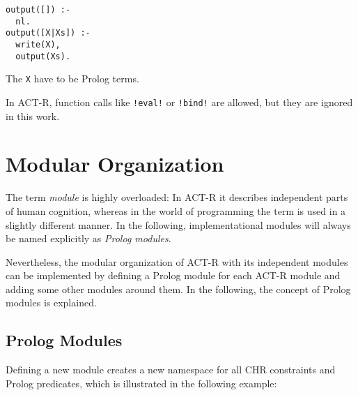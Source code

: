 \begin{lstlisting}
output([]) :-
  nl.
output([X|Xs]) :-
  write(X),
  output(Xs).
\end{lstlisting}

The \verb|X| have to be Prolog terms.

In ACT-R, function calls like \verb|!eval!| or \verb|!bind!| are allowed, but they are ignored in this work.

\section{Modular Organization}

The term \emph{module} is highly overloaded: In ACT-R it describes independent parts of human cognition, whereas in the world of programming the term is used in a slightly different manner. In the following, implementational modules will always be named explicitly as \emph{Prolog modules}.

Nevertheless, the modular organization of ACT-R with its independent modules can be implemented by defining a Prolog module for each ACT-R module and adding some other modules around them. In the following, the concept of Prolog modules is explained.

\subsection{Prolog Modules}

Defining a new module creates a new namespace for all CHR constraints and Prolog predicates, which is illustrated in the following example:

